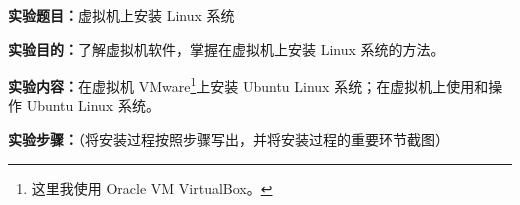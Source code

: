 \documentclass[cs4size,a4paper,nofonts]{ctexart}
\begin{document}



\CTEXnoindent

{\bf 实验题目：}虚拟机上安装 Linux 系统

{\bf 实验目的：}了解虚拟机软件，掌握在虚拟机上安装 Linux 系统的方法。

{\bf 实验内容：}在虚拟机 VMware\footnote{这里我使用 Oracle VM VirtualBox。}上安装 Ubuntu Linux 系统；在虚拟机上使用和操作 Ubuntu Linux 系统。

{\bf 实验步骤：}（将安装过程按照步骤写出，并将安装过程的重要环节截图）

\newcommand{\image}[3][width=\textwidth]{\begin{minipage}[t]{0.5\textwidth}
\centering
\texttt{[image: images/\#2.png]}
\caption{#3}
\label{fig:#3}
\end{minipage}}

\newcommand{\images}[3][width=\textwidth]{\begin{minipage}[t]{0.33\textwidth}
\centering
\texttt{[image: images/\#2.png]}
\caption{#3}
\label{fig:#3}
\end{minipage}}
\end{document}
